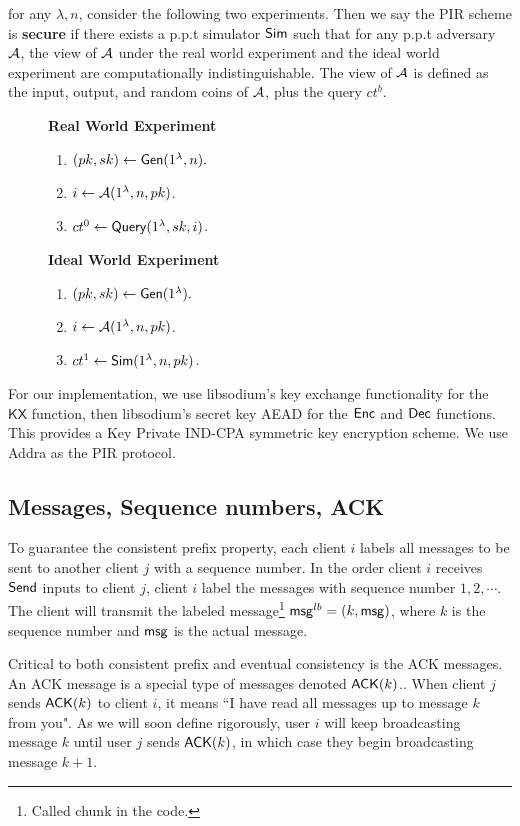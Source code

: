 \begin{definition}[Privacy]
for any $\lambda, n$, consider the following two experiments. Then we say the PIR scheme is \textbf{secure} if there exists a p.p.t simulator $\mathsf{Sim}$ such that for any p.p.t adversary $\mathcal{A}$, the view of $\mathcal{A}$ under the real world experiment and the ideal world experiment are computationally indistinguishable. The view of $\mathcal{A}$ is defined as the input, output, and random coins of $\mathcal{A}$, plus the query $ct^b$.
\begin{figure}[h!]
\begin{framed}
\textbf{Real World Experiment}
\begin{enumerate}
    \item $(pk, sk) \leftarrow \mathsf{Gen}(1^{\lambda}, n).$
    \item $i \leftarrow \mathcal{A}(1^{\lambda}, n, pk)$.
    \item $ct^0 \leftarrow \mathsf{Query}(1^{\lambda}, sk, i)$.
\end{enumerate}
\textbf{Ideal World Experiment}
\begin{enumerate}
    \item $(pk, sk) \leftarrow \mathsf{Gen}(1^{\lambda}).$
    \item $i \leftarrow \mathcal{A}(1^{\lambda}, n, pk)$.
    \item $ct^1 \leftarrow \mathsf{Sim}(1^{\lambda}, n, pk)$.
\end{enumerate}
\end{framed}
\end{figure}
\end{definition}
For our implementation, we use libsodium's key exchange functionality for the $\mathsf{KX}$ function, then libsodium's secret key AEAD for the $\mathsf{Enc}$ and $\mathsf{Dec}$ functions. This provides a Key Private IND-CPA symmetric key encryption scheme. We use Addra as the PIR protocol.
\subsection{Messages, Sequence numbers, ACK}
To guarantee the consistent prefix property, each client $i$ labels all messages to be sent to another client $j$ with a sequence number. In the order client $i$ receives $\mathsf{Send}$ inputs to client $j$, client $i$ label the messages with sequence number $1,2,\cdots$. The client will transmit the labeled message\footnote{Called chunk in the code.} $\mathsf{msg}^{lb} = (k, \mathsf{msg})$, where $k$ is the sequence number and $\mathsf{msg}$ is the actual message. 

Critical to both consistent prefix and eventual consistency is the ACK messages. An ACK message is a special type of messages denoted $\mathsf{ACK}(k)$.. When client $j$ sends $\mathsf{ACK}(k)$ to client $i$, it means ``I have read all messages up to message $k$ from you". As we will soon define rigorously, user $i$ will keep broadcasting message $k$ until user $j$ sends $\mathsf{ACK}(k)$, in which case they begin broadcasting message $k + 1$. 

